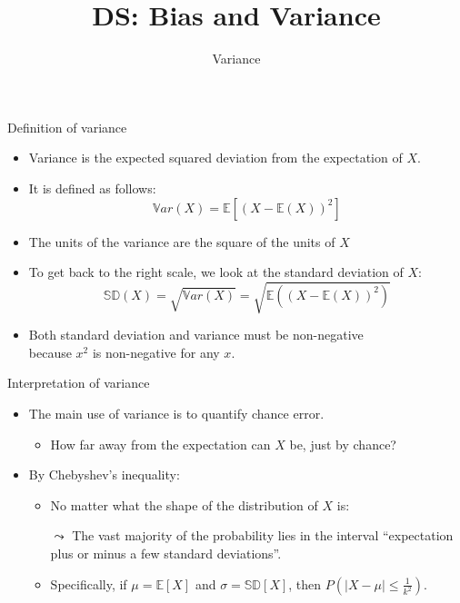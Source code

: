 \documentclass[aspectratio=169]{../latex_main/tntbeamer}  %
\title[Statistics]{DS: Bias and Variance}
\subtitle{Variance}
\begin{document}
	
	\maketitle
	\begin{frame}{Definition of variance}
	    \begin{itemize}
	        \item \alert{Variance} is the expected squared deviation from the expectation of $X$.
	        \item It is defined as follows:
	        \begin{equation*}
	            \mathbb{V}ar(X) = \mathbb{E}\left[(X - \mathbb{E}(X))^2\right]
	        \end{equation*}
	        \item The units of the variance are the square of the units of $X$
	        \item To get back to the right scale, we look at the \alert{standard deviation} of $X$:
	        \begin{equation*}
	            \mathbb{SD}(X)  = \sqrt{\mathbb{V}ar(X)}  =\sqrt{\mathbb{E}((X - \mathbb{E}(X))^2)}
	        \end{equation*}
	        \item Both standard deviation and variance must be non-negative\\ because $x^2$ is non-negative for any $x$.
	    \end{itemize}
	\end{frame}
	
	
	\begin{frame}[c]{Interpretation of variance}
	    \begin{itemize}
	        \item The main use of variance is to quantify chance error.
	        \begin{itemize}
	            \item How far away from the expectation can $X$ be, just by chance?
	        \end{itemize}
	        \item By Chebyshev’s inequality:
	        \begin{itemize}
	            \item No matter what the shape of the distribution of $X$ is:
	            \item[$\leadsto$] The vast majority of the probability lies in the interval “expectation plus or minus a few standard deviations”.
	            \item Specifically, if   $\mu  = \mathbb{E}[X]$ and    $\sigma   = \mathbb{SD}[X]$, then $P(|X - \mu| \leq \frac{1}{k^2})$.   
	        \end{itemize}
	    \end{itemize}
	\end{frame}
	
\end{document}
